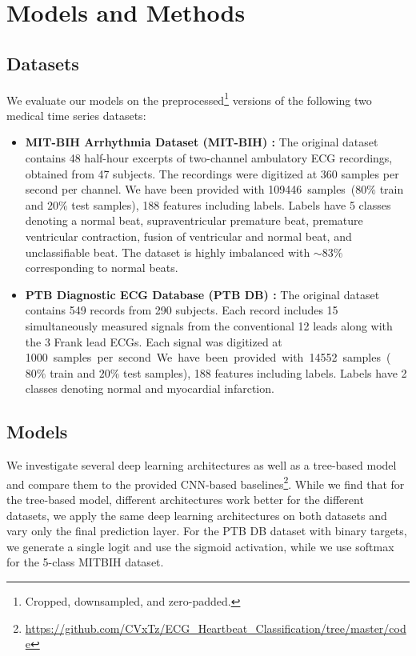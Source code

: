 \section{Models and Methods}
\label{sec:models_and_methods}
\subsection{Datasets}
We evaluate our models on the preprocessed\footnote{Cropped, downsampled, and zero-padded.} versions of the following two medical time series datasets:

\begin{itemize}[leftmargin=0cm]
    \setlength\itemsep{0.6em}
    \item[]
    \textbf{MIT-BIH Arrhythmia Dataset (MIT-BIH) \citep{moody2001impact, goldberger2000physiobank}:}
    The original dataset contains 48 half-hour excerpts of two-channel ambulatory ECG recordings, obtained from 47 subjects. The recordings were digitized at 360 samples per second per channel. We have been provided with \SI{109446} samples ($80\%$ train and $20\%$ test samples), 188 features including labels. Labels have 5 classes denoting a normal beat, supraventricular premature beat, premature ventricular contraction, fusion of ventricular and normal beat, and unclassifiable beat. The dataset is highly imbalanced with ${\sim}83\%$ corresponding to normal beats.
    
    \item[]
    \textbf{PTB Diagnostic ECG Database (PTB DB) \citep{bousseljot1995nutzung, goldberger2000physiobank}:} The original dataset contains 549 records from 290 subjects. Each record includes 15 simultaneously measured signals from the conventional 12 leads along with the 3 Frank lead ECGs. Each signal was digitized at \SI{1000} samples per second. We have been provided with \SI{14552} samples ($80\%$ train and $20\%$ test samples), 188 features including labels. Labels have 2 classes denoting normal and myocardial infarction.
\end{itemize}


\subsection{Models}
We investigate several deep learning architectures as well as a tree-based model and compare them to the provided CNN-based baselines\footnote{\url{https://github.com/CVxTz/ECG_Heartbeat_Classification/tree/master/code}}.
While we find that for the tree-based model, different architectures work better for the different datasets, we apply the same deep learning architectures on both datasets and vary only the final prediction layer. For the PTB DB dataset with binary targets, we generate a single logit and use the sigmoid activation, while we use softmax for the 5-class MITBIH dataset.

